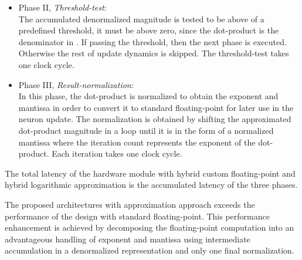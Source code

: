 \begin{itemize}
 	\item{Phase II, \emph{Threshold-test}}: \\
	The accumulated denormalized magnitude is tested to be above of a predefined threshold, it must be above zero, since the dot-product is the denominator in .
 	If passing the threshold, then the next phase is executed. Otherwise the rest of update dynamics is skipped. The threshold-test takes one clock cycle.
 	\item{Phase III, \emph{Result-normalization}}: \\
 	In this phase, the dot-product is normalized to obtain the exponent and mantissa in order to convert it to standard floating-point for later use in the neuron update. The normalization is obtained by shifting the approximated dot-product magnitude in a loop until it is in the form of a normalized mantissa where the iteration count represents the exponent of the dot-product. Each iteration takes one clock cycle.
 	
 \end{itemize}

The total latency of the hardware module with hybrid custom floating-point and hybrid logarithmic approximation is the accumulated latency of the three phases.

The proposed architectures with approximation approach exceeds the performance of the design with standard floating-point. This performance enhancement is achieved by decomposing the floating-point computation into an advantageous handling of exponent and mantissa using intermediate accumulation in a denormalized representation and only one final normalization.


